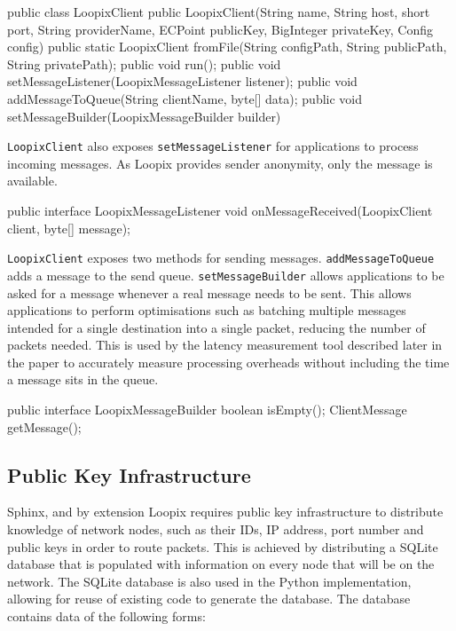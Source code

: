 \documentclass[final,dissertation.tex]{subfiles}
\begin{document}
\begin{javacode}
public class LoopixClient {
    public LoopixClient(String name, String host, short port, 
        String providerName, ECPoint publicKey, BigInteger privateKey, 
        Config config)
    public static LoopixClient fromFile(String configPath, 
        String publicPath, String privatePath);
    public void run();
    public void setMessageListener(LoopixMessageListener listener);
    public void addMessageToQueue(String clientName, byte[] data);
    public void setMessageBuilder(LoopixMessageBuilder builder)
}
\end{javacode}

\verb|LoopixClient| also exposes \verb|setMessageListener| for applications to process incoming messages. As Loopix provides sender anonymity, only the message is available.

\begin{javacode}
public interface LoopixMessageListener {
	void onMessageReceived(LoopixClient client, byte[] message);
}
\end{javacode}

\verb|LoopixClient| exposes two methods for sending messages. \verb|addMessageToQueue| adds a message to the send queue. \verb|setMessageBuilder| allows applications to be asked for a message whenever a real message needs to be sent. This allows applications to perform optimisations such as batching multiple messages intended for a single destination into a single packet, reducing the number of packets needed. This is used by the latency measurement tool described later in the paper to accurately measure processing overheads without including the time a message sits in the queue.

\begin{javacode}
public interface LoopixMessageBuilder {
	boolean isEmpty();
	ClientMessage getMessage();
}
\end{javacode}

\subsection{Public Key Infrastructure}

Sphinx, and by extension Loopix requires public key infrastructure to distribute knowledge of network nodes, such as their IDs, IP address, port number and public keys in order to route packets. This is achieved by distributing a SQLite database that is populated with information on every node that will be on the network. The SQLite database is also used in the Python implementation, allowing for reuse of existing code to generate the database. The database contains data of the following forms:
\end{document}
